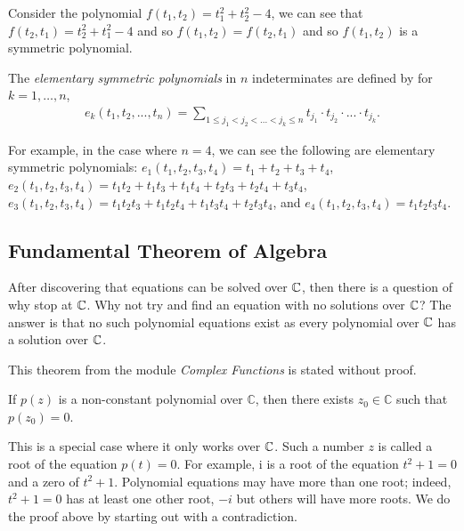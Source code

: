 \begin{example}
    Consider the polynomial 
    $f(t_1,t_2)=t_1^2+t_2^2-4$, we can see that $f(t_2,t_1)=t_2^2+t_1^2-4$ and so $f(t_1,t_2)=f(t_2,t_1)$ and so $f(t_1,t_2)$ is a symmetric polynomial.
\end{example}

\begin{definition}
    The \textit{elementary symmetric polynomials} in $n$ indeterminates are defined by for $k = 1, \dots, n$,
    \begin{align*}
    e_k(t_1,t_2,...,t_n) = \sum_{1\leq j_1<j_2<...<j_k\leq n} t_{j_1}\cdot t_{j_2} \cdot ... \cdot t_{j_k}.
    \end{align*}
\end{definition}

\begin{example}
    For example, in the case where $n=4$, we can see the following are elementary symmetric polynomials: $e_1(t_1,t_2,t_3,t_4) = t_1 + t_2 + t_3 + t_4$, $e_2(t_1, t_2, t_3, t_4) = t_1t_2 + t_1t_3 + t_1t_4 + t_2t_3 + t_2t_4 + t_3t_4$,  $e_3(t_1,t_2,t_3,t_4) = t_1t_2t_3+t_1t_2t_4+t_1t_3t_4+t_2t_3t_4$, and $e_4(t_1, t_2, t_3, t_4) = t_1 t_2 t_3 t_4$. 
\end{example}


\subsection{Fundamental Theorem of Algebra} 

After discovering that equations can be solved over $\mathbb C$, then there is a question of why stop at $\mathbb C$. Why not try and find an equation with no solutions over $\mathbb C$? The answer is that no such polynomial equations exist as every polynomial over $\mathbb C$ has a solution over $\mathbb C$.

This theorem from the module \textit{Complex Functions} is stated without proof. 

\begin{theorem} \label{thm:fundamental-algebra}
	If $p(z)$ is a non-constant polynomial over $\mathbb{C}$, then there exists $z_0 \in \mathbb{C}$ such that $p\left(z_0\right)=0$.
\end{theorem}

This is a special case where it only works over $\mathbb C$. Such a number $z$ is called a root of the equation $p(t)=0$. For example, $\mathrm{i}$ is a root of the equation $t^2+1=0$ and a zero of $t^2+1$. Polynomial equations may have more than one root; indeed, $t^2+1=0$ has at least one other root, $-i$ but others will have more roots. We do the proof above by starting out with a contradiction.

